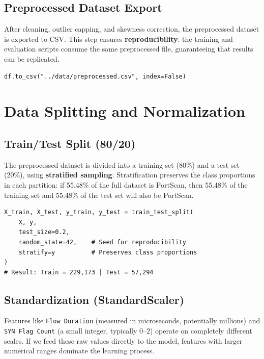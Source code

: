 \documentclass[12pt,a4paper]{report}
\begin{document}
\subsection{Preprocessed Dataset Export}

After cleaning, outlier capping, and skewness correction, the preprocessed dataset is exported to CSV. This step ensures \textbf{reproducibility}: the training and evaluation scripts consume the same preprocessed file, guaranteeing that results can be replicated.

\begin{lstlisting}[caption={Exporting the preprocessed dataset}]
df.to_csv("../data/preprocessed.csv", index=False)
\end{lstlisting}

\section{Data Splitting and Normalization}

\subsection{Train/Test Split (80/20)}

The preprocessed dataset is divided into a training set (80\%) and a test set (20\%), using \textbf{stratified sampling}. Stratification preserves the class proportions in each partition: if 55.48\% of the full dataset is PortScan, then 55.48\% of the training set and 55.48\% of the test set will also be PortScan.

\begin{lstlisting}[caption={Stratified dataset splitting}]
X_train, X_test, y_train, y_test = train_test_split(
    X, y,
    test_size=0.2,
    random_state=42,    # Seed for reproducibility
    stratify=y          # Preserves class proportions
)
# Result: Train = 229,173 | Test = 57,294
\end{lstlisting}

\subsection{Standardization (StandardScaler)}
\label{sec:standardscaler}

Features like \texttt{Flow Duration} (measured in microseconds, potentially millions) and \texttt{SYN Flag Count} (a small integer, typically 0--2) operate on completely different scales. If we feed these raw values directly to the model, features with larger numerical ranges dominate the learning process.
\end{document}
